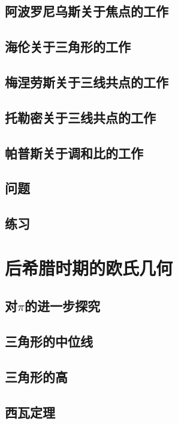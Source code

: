 \documentclass[cn,fancy,blue,11pt]{elegantbook}
\begin{document}
\section{阿波罗尼乌斯关于焦点的工作}

\section{海伦关于三角形的工作}

\section{梅涅劳斯关于三线共点的工作}

\section{托勒密关于三线共点的工作}

\section{帕普斯关于调和比的工作}

\section{问题}

\section{练习}

\chapter{后希腊时期的欧氏几何}

\section{对$\pi$的进一步探究}

\section{三角形的中位线}

\section{三角形的高}

\section{西瓦定理}
\end{document}
